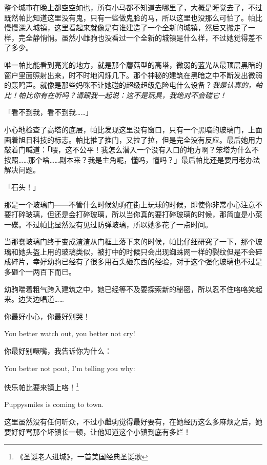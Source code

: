 整个城市在晚上都空空如也，所有小马都不知道去哪里了，大概是睡觉去了，不过既然帕比知道这里没有鬼，只有一些做鬼脸的马，所以这里也没那么可怕了。帕比慢慢深入城镇，这里看起来就像是有谁建造了一个全新的城镇，然后又搬走了一样，完全静悄悄。虽然小雌驹也没看过一个全新的城镇是什么样，不过她觉得差不了多少。

唯一帕比能看到亮光的地方，就是那个蘑菇型的高塔，微弱的蓝光从最顶层黑暗的窗户里面照射出来，时不时地闪烁几下。那个神秘的建筑在黑暗之中不断发出微弱的轰鸣声。就像是那些妈咪不让她碰的超级超级危险电什么设备？\emph{我是认真的，帕比！帕比你有在听吗？请跟我一起说：这不是玩具，我绝对不会碰它！}

「看不到我，看不到我……」

小心地检查了高塔的底层，帕比发现这里没有窗口，只有一个黑暗的玻璃门，上面画着旭日科技的标志。帕比推了推门，又拉了拉，但是完全没有反应。最后她用力敲着门喊道：「喂，这不公平！我怎么潜入一个没有入口的地方啊？笨塔为什么不按照……那个啥……剧本来？我是主角呢，懂吗，懂吗？」最后帕比还是要用老办法解决问题。

「石头！」

那是一个玻璃门——不管什么时候幼驹在街上玩球的时候，即使你非常小心注意不要打碎玻璃，但还是会打碎玻璃，所以当你真的要打碎玻璃的时候，那简直是小菜一碟。不过帕比显然没有见过防弹玻璃，所以她多花了一点时间。

当那蠢玻璃门终于变成渣渣从门框上落下来的时候，帕比仔细研究了一下，那个玻璃和她头盔上用的玻璃类似，被打中的时候只会出现蜘蛛网一样的裂纹但是不会碎成碎片，幸好幼驹已经有了很多用石头砸东西的经验，对于这个强化玻璃也不过是多砸个一两百下而已。

幼驹喘着粗气跨入建筑之中，她已经等不及要探索新的秘密，所以忍不住咯咯笑起来。边笑边唱道……

\begin{song}
你最好小心，你最好别哭！

You better watch out, you better not cry!

\medskip

你最好别噘嘴，我告诉你为什么：

You better not pout, I'm telling you why:

\medskip

快乐帕比要来镇上咯！\footnote{《圣诞老人进城》，一首美国经典圣诞歌}

Puppysmiles is coming to town.
\end{song}

这里虽然没有任何听众，不过小雌驹觉得最好要有，在她经历这么多麻烦之后，她要好好骂那个坏镇长一顿，让他知道这个小镇到底有多烂！

